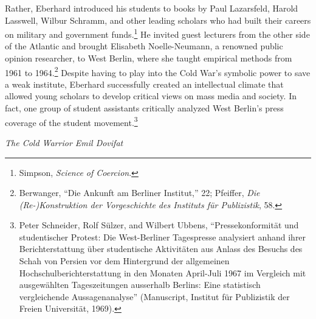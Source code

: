 \documentclass{tufte-handout}
\begin{document}
Rather, Eberhard introduced his students to books by Paul Lazarsfeld,
Harold Lasswell, Wilbur Schramm, and other leading scholars who had
built their careers on military and government funds.\footnote{Simpson,
  \emph{Science of Coercion}.} He invited guest lecturers from the other
side of the Atlantic and brought Elisabeth Noelle-Neumann, a renowned
public opinion researcher, to West Berlin, where she taught empirical
methods from 1961 to 1964.\footnote{Berwanger, ``Die Ankunft am Berliner
  Institut,'' 22; Pfeiffer, \emph{Die (Re-)Konstruktion der
  Vorgeschichte des Instituts für Publizistik}, 58.} Despite having to
play into the Cold War's symbolic power to save a weak institute,
Eberhard successfully created an intellectual climate that allowed young
scholars to develop critical views on mass media and society. In fact,
one group of student assistants critically analyzed West Berlin's press
coverage of the student movement.\footnote{Peter Schneider, Rolf Sülzer,
  and Wilbert Ubbens, ``Pressekonformität und studentischer Protest: Die
  West-Berliner Tagespresse analysiert anhand ihrer Berichterstattung
  über studentische Aktivitäten aus Anlass des Besuchs des Schah von
  Persien vor dem Hintergrund der allgemeinen Hochschulberichterstattung
  in den Monaten April-Juli 1967 im Vergleich mit ausgewählten
  Tageszeitungen ausserhalb Berlins: Eine statistisch vergleichende
  Aussagenanalyse'' (Manuscript, Institut für Publizistik der Freien
  Universität, 1969).}
  
  
  \vspace*{0.75em} 

\begin{centering}

\noindent \emph{The Cold Warrior Emil Dovifat}

\end{centering}


\vspace*{0.5em} 
\end{document}

